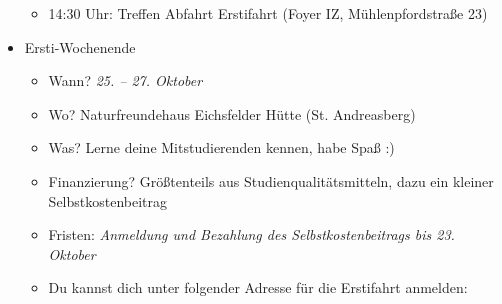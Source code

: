 \begin{itemize}
\begin{itemize}
            \item 14:30 Uhr: Treffen Abfahrt Erstifahrt (Foyer IZ, Mühlenpfordstraße 23)
        \end{itemize}
    \item Ersti-Wochenende
        \begin{itemize}
            \item Wann? \textit{25. – 27. Oktober}
            \item Wo? Naturfreundehaus Eichsfelder Hütte (St. Andreasberg)
            \item Was? Lerne deine Mitstudierenden kennen, habe Spaß :)
            \item Finanzierung? Größtenteils aus Studienqualitätsmitteln, dazu ein kleiner Selbstkostenbeitrag
            \item Fristen: \textit{Anmeldung und Bezahlung des Selbstkostenbeitrags bis 23. Oktober}
            \item Du kannst dich unter folgender Adresse für die Erstifahrt anmelden: 
        \end{itemize}
    \end{itemize}

